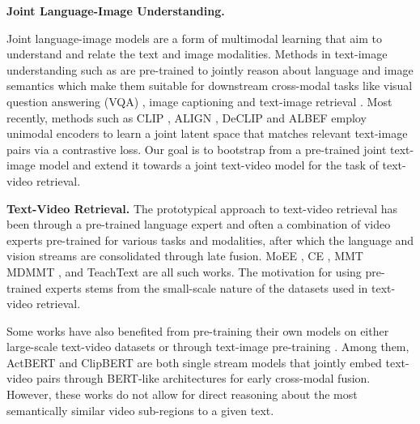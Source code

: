 \documentclass[10pt,twocolumn,letterpaper]{article}
\begin{document}
\textbf{Joint Language-Image Understanding.} 

Joint language-image models are a form of multimodal learning \cite{baltruvsaitis2018multimodal} that aim to understand and relate the text and image modalities. Methods in text-image understanding such as \cite{li2019visualbert, lu2019vilbert, tan2019lxmert, chen2020uniter, li2020oscar, radford2021learning, jia2021scaling, li2021align} are pre-trained to jointly reason about language and image semantics which make them suitable for downstream cross-modal tasks like visual question answering (VQA) \cite{antol2015vqa}, image captioning \cite{xu2015show} and text-image retrieval \cite{karpathy2015deep}. Most recently, methods such as CLIP \cite{radford2021learning}, ALIGN \cite{jia2021scaling}, DeCLIP \cite{li2021supervision} and ALBEF \cite{li2021align} employ unimodal encoders to learn a joint latent space that matches relevant text-image pairs via a contrastive loss. Our goal is to bootstrap from a pre-trained joint text-image model and extend it towards a joint text-video model for the task of text-video retrieval.


\textbf{Text-Video Retrieval.} The prototypical approach to text-video retrieval has been through a pre-trained language expert and often a combination of video experts pre-trained for various tasks and modalities, after which the language and vision streams are consolidated through late fusion. MoEE \cite{miech2018learning}, CE \cite{liu2019use}, MMT \cite{gabeur2020multi} MDMMT \cite{dzabraev2021mdmmt}, and TeachText \cite{croitoru2021teachtext} are all such works. The motivation for using pre-trained experts stems from the small-scale nature of the datasets used in text-video retrieval.

Some works have also benefited from pre-training their own models on either large-scale text-video datasets \cite{miech2019howto100m, zhu2020actbert, bain2021frozen} or through text-image pre-training \cite{miech2018learning, lei2021less}. Among them, ActBERT \cite{zhu2020actbert} and ClipBERT \cite{lei2021less} are both single
stream models that jointly embed text-video pairs through BERT-like architectures for early cross-modal fusion. However, these works do not allow for direct reasoning about the most semantically similar video sub-regions to a given text.
\end{document}
